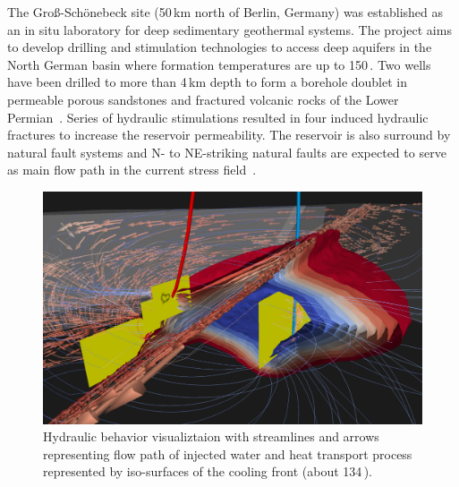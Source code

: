 \documentclass[twocolumn]{svjour3}          %
\begin{document}
The Gro{\ss}-Sch\"onebeck site (50\,km north of Berlin, Germany) was established as an in situ laboratory for deep sedimentary geothermal systems. The project aims to develop drilling and stimulation technologies to access deep aquifers in the North German basin where formation temperatures are up to 150\,\celsius. Two wells have been drilled to more than 4\,km depth to form a borehole doublet in permeable porous sandstones and fractured volcanic rocks of the Lower Permian~\cite{zimmermann:geothermal}. Series of hydraulic stimulations resulted in four induced hydraulic fractures to increase the reservoir permeability. The reservoir is also surround by natural fault systems and N- to NE-striking natural faults are expected to serve as main flow path in the current stress field~\cite{bloecher:geothermal}.

\begin{figure}[htb]
  \includegraphics[width=\linewidth]{images/geothermal.jpg}
\caption{Hydraulic behavior visualiztaion with streamlines and arrows representing flow path of injected water and heat transport process represented by iso-surfaces of the cooling front (about 134\,\celsius).}
\label{fig:geothermal}
\end{figure}
\end{document}
